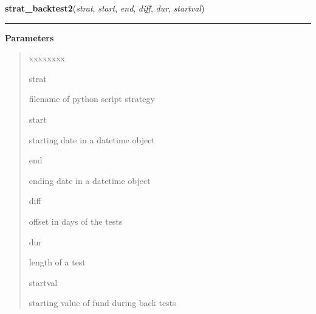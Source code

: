 \hspace{.8\funcindent}\begin{boxedminipage}{\funcwidth}

    \raggedright \textbf{strat\_backtest2}(\textit{strat}, \textit{start}, \textit{end}, \textit{diff}, \textit{dur}, \textit{startval})

    \vspace{-1.5ex}

    \rule{\textwidth}{0.5\fboxrule}
\setlength{\parskip}{2ex}
\setlength{\parskip}{1ex}
      \textbf{Parameters}
      \vspace{-1ex}

      \begin{quote}
        \begin{Ventry}{xxxxxxxx}

          \item[strat]

          filename of python script strategy

          \item[start]

          starting date in a datetime object

          \item[end]

          ending date in a datetime object

          \item[diff]

          offset in days of the tests

          \item[dur]

          length of a test

          \item[startval]

          starting value of fund during back tests

        \end{Ventry}

      \end{quote}

    \end{boxedminipage}

    \label{QSTK:qstklearn:mldiagnostics:beta}

    \vspace{0.5ex}

